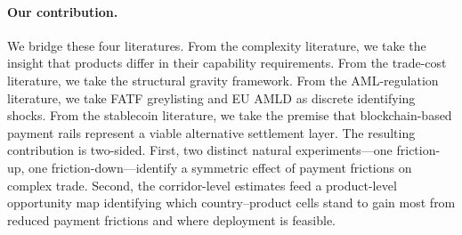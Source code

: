 \paragraph{Our contribution.}
We bridge these four literatures. From the complexity literature, we take the insight that products differ in their capability requirements. From the trade-cost literature, we take the structural gravity framework. From the AML-regulation literature, we take FATF greylisting and EU AMLD as discrete identifying shocks. From the stablecoin literature, we take the premise that blockchain-based payment rails represent a viable alternative settlement layer. The resulting contribution is two-sided. First, two distinct natural experiments---one friction-up, one friction-down---identify a symmetric effect of payment frictions on complex trade. Second, the corridor-level estimates feed a product-level opportunity map identifying which country--product cells stand to gain most from reduced payment frictions and where deployment is feasible.
